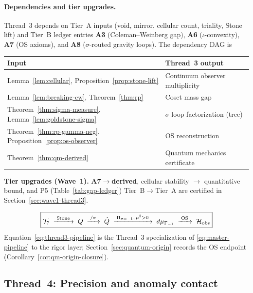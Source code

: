 \paragraph{Dependencies and tier upgrades.}
Thread~3 depends on Tier~A inputs (void, mirror, cellular count, triality,
Stone lift) and Tier~B ledger entries \textbf{A3} (Coleman--Weinberg gap),
\textbf{A6} ($\iota$-convexity), \textbf{A7} (OS axioms), and \textbf{A8}
($\sigma$-routed gravity loops). The dependency DAG is
\begin{center}
\small
\begin{tabular}{@{}ll@{}}
\toprule
\textbf{Input} & \textbf{Thread~3 output} \\
\midrule
Lemma~\ref{lem:cellular}, Proposition~\ref{prop:stone-lift} &
  Continuum observer multiplicity \\
Lemma~\ref{lem:breaking-cw}, Theorem~\ref{thm:rp} &
  Coset mass gap \\
Theorem~\ref{thm:sigma-measure}, Lemma~\ref{lem:goldstone-sigma} &
  $\sigma$-loop factorization (tree) \\
Theorem~\ref{thm:rp-gamma-neg}, Proposition~\ref{prop:os-observer} &
  OS reconstruction \\
Theorem~\ref{thm:qm-derived} &
  Quantum mechanics certificate \\
\bottomrule
\end{tabular}
\end{center}
\textbf{Tier upgrades (Wave~1).} \textbf{A7}$\to$\textbf{derived},
cellular stability $\to$ quantitative bound, and P5
(Table~\ref{tab:gap-ledger}) Tier~B$\to$Tier~A are certified in
Section~\ref{sec:wave1-thread3}.

\begin{equation}\label{eq:thread3-pipeline}
  \boxed{%
  \mathcal{T}_7
  \;\xrightarrow{\;\text{Stone}\;}\;
  Q
  \;\xrightarrow{\;/\sigma\;}\;
  \hat Q
  \;\xrightarrow{\;\Pi_{\sigma=-1},\,\mu^2>0\;}\;
  d\mu_{\Gamma_{-1}}
  \;\xrightarrow{\;\text{OS}\;}\;
  \mathcal{H}_{\mathrm{obs}}
  }
\end{equation}
Equation~\eqref{eq:thread3-pipeline} is the Thread~3 specialization of
\eqref{eq:master-pipeline} to the rigor layer; Section~\ref{sec:quantum-origin}
records the OS endpoint (Corollary~\ref{cor:qm-origin-closure}).

\subsection{Thread~4: Precision and anomaly contact}
\label{sec:thread-4}

